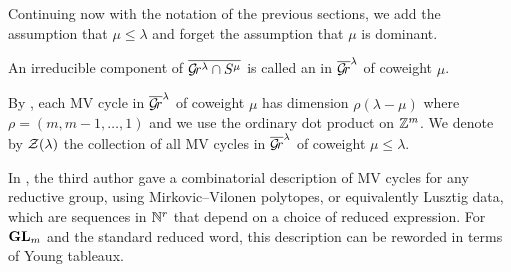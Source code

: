 \documentclass[draft]{article} %
\begin{document}
Continuing now with the notation of the previous sections, we add the assumption that $\mu\le\lambda$ and forget the assumption that $\mu$ is dominant. 
% 
% 
% 
\begin{definition}
An irreducible component of $\overline{\mathcal{G}\!r^\lambda \cap S^\mu}$ is called an  in $\overline{\mathcal{G}\!r}^\lambda$ of coweight $\mu$. 
\end{definition}



By \cite[Theorem~3.2(b)]{mirkovic2007geometric}, each MV cycle in $\overline{\mathcal{G}\!r}^\lambda$ of coweight $\mu$ has dimension $ \rho(\lambda - \mu)$ where $ \rho = (m, m-1, \dots, 1)$ and we use the ordinary dot product on $\mathbb Z^m$.
We denote by $\mathcal Z(\lambda)$ the collection of all MV cycles in $\overline{\mathcal{G}\!r}^\lambda$ of coweight $\mu\le\lambda$. 



% 

In \cite{kamnitzer2010mirkovic}, the third author gave a combinatorial description of MV cycles for any reductive group, using Mirkovic--Vilonen polytopes, or equivalently Lusztig data, which are sequences in $\mathbb N^{r}$ that depend on a choice of reduced expression. For ${\mathbf{GL}}_m$ and the standard reduced word, this description can be reworded in terms of Young tableaux. 
\end{document}

